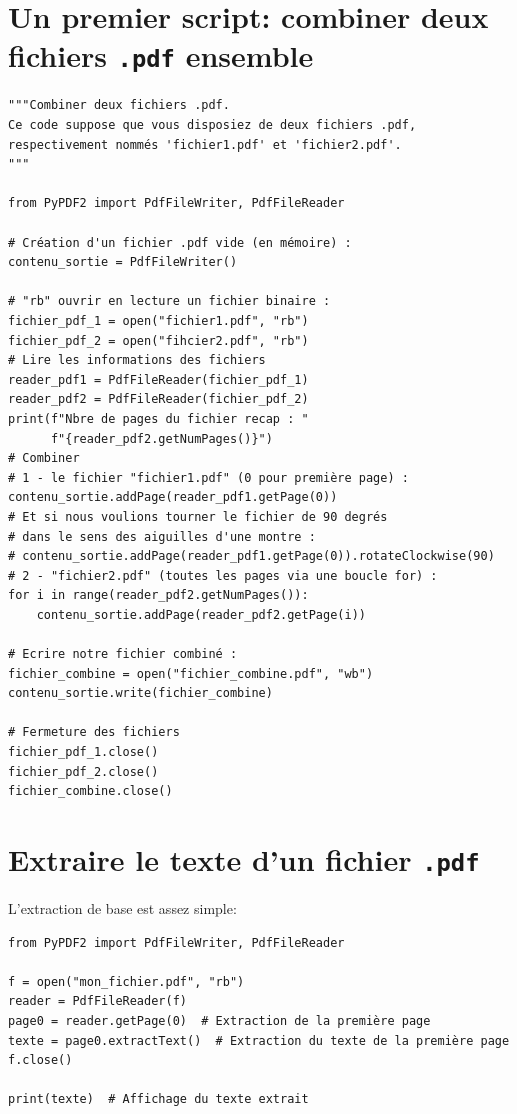 \documentclass[a4paper,11pt]{book}
\begin{document}
\section{Un premier script: combiner deux fichiers \texttt{.pdf} ensemble}
\begin{lstlisting}
"""Combiner deux fichiers .pdf.
Ce code suppose que vous disposiez de deux fichiers .pdf,
respectivement nommés 'fichier1.pdf' et 'fichier2.pdf'.
"""

from PyPDF2 import PdfFileWriter, PdfFileReader

# Création d'un fichier .pdf vide (en mémoire) :
contenu_sortie = PdfFileWriter()

# "rb" ouvrir en lecture un fichier binaire :
fichier_pdf_1 = open("fichier1.pdf", "rb")
fichier_pdf_2 = open("fihcier2.pdf", "rb")
# Lire les informations des fichiers
reader_pdf1 = PdfFileReader(fichier_pdf_1)
reader_pdf2 = PdfFileReader(fichier_pdf_2)
print(f"Nbre de pages du fichier recap : "
      f"{reader_pdf2.getNumPages()}")
# Combiner
# 1 - le fichier "fichier1.pdf" (0 pour première page) :
contenu_sortie.addPage(reader_pdf1.getPage(0))
# Et si nous voulions tourner le fichier de 90 degrés
# dans le sens des aiguilles d'une montre :
# contenu_sortie.addPage(reader_pdf1.getPage(0)).rotateClockwise(90)
# 2 - "fichier2.pdf" (toutes les pages via une boucle for) :
for i in range(reader_pdf2.getNumPages()):
    contenu_sortie.addPage(reader_pdf2.getPage(i))

# Ecrire notre fichier combiné :
fichier_combine = open("fichier_combine.pdf", "wb")
contenu_sortie.write(fichier_combine)

# Fermeture des fichiers
fichier_pdf_1.close()
fichier_pdf_2.close()
fichier_combine.close()
\end{lstlisting}
\medskip

\section{Extraire le texte d'un fichier \texttt{.pdf}}
L'extraction de base est assez simple:
\begin{lstlisting}
from PyPDF2 import PdfFileWriter, PdfFileReader

f = open("mon_fichier.pdf", "rb") 
reader = PdfFileReader(f)
page0 = reader.getPage(0)  # Extraction de la première page
texte = page0.extractText()  # Extraction du texte de la première page
f.close()

print(texte)  # Affichage du texte extrait
\end{lstlisting}
\medskip
\end{document}
